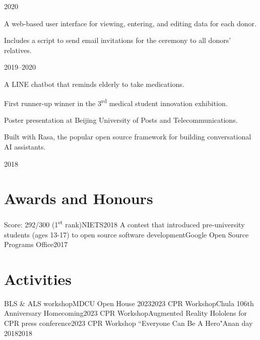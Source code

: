 \documentclass{cv}
\begin{document}
\begin{cv_table}
{  }{}{2020}
  {\begin{cv_itemize}
      \item A web-based user interface for viewing, entering, and editing data for each donor.
      \item Includes a script to send email invitations for the ceremony to all donors' relatives.
    \end{cv_itemize}
  }{}{2019--2020}
  {\begin{cv_itemize}
      \item A LINE chatbot that reminds elderly to take medications.
      \item First runner-up winner in the 3\textsuperscript{rd} medical student innovation exhibition.
      \item Poster presentation at Beijing University of Posts and Telecommunications.
      \item Built with Rasa, the popular open source framework for building conversational AI assistants.
    \end{cv_itemize}
  }{}{2018}
\end{cv_table}

\section{Awards and Honours}
\begin{cv_table}
  {Score: 292/300 (1\textsuperscript{st} rank)}{NIETS}{2018}
  {A contest that introduced pre-university students (ages 13-17) to open source software development}{Google Open Source Programs Office}{2017}
\end{cv_table}

\section{Activities}
\begin{cv_table}
  {BLS \& ALS workshop}{MDCU Open House 2023}{2023}
  {CPR Workshop}{Chula 106th Anniversary Homecoming}{2023}
  {CPR Workshop}{Augmented Reality Hololens for CPR press conference}{2023}
  {CPR Workshop ``Everyone Can Be A Hero"}{Anan day 2018}{2018}
\end{cv_table}
\end{document}
